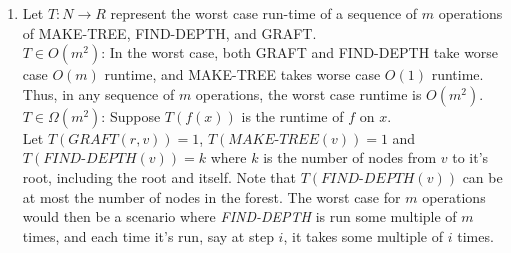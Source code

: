 \documentclass[letterpaper,10pt]{article}
\begin{document}
\begin{enumerate}
  \begin{enumerate}
    \item Let $T: N \rightarrow R$ represent the worst case run-time of a sequence of $m$ operations of MAKE-TREE, FIND-DEPTH, and GRAFT. 
\\$T \in O(m^2)$: In the worst case, both GRAFT and FIND-DEPTH take worse case $O(m)$ runtime, and MAKE-TREE takes worse case $O(1)$ runtime. Thus, in any sequence of $m$ operations, the worst case runtime is $O(m^2)$.
\\$T \in \Omega(m^2)$: Suppose $T(f(x))$ is the runtime of $f$ on $x$. 
\\Let $T(\textit{GRAFT}(r, v)) = 1$, $T(\textit{MAKE-TREE}(v)) = 1$ and 
\\$T(\textit{FIND-DEPTH}(v)) = k$ where $k$ is the number of nodes from $v$ to it's root, including the root and itself. Note that $T(\textit{FIND-DEPTH}(v))$ can be at most the number of nodes in the forest. The worst case for $m$ operations would then be a scenario where \textit{FIND-DEPTH} is run some multiple of $m$ times, and each time it's run, say at step $i$, it takes some multiple of $i$ times. 


\end{enumerate}
\end{enumerate}
\end{document}
